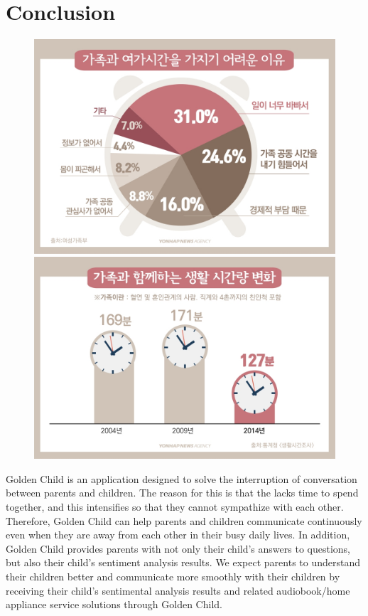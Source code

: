 \documentclass[conference]{IEEEtran}
\begin{document}
\section{\large{Conclusion}}
\begin{figure}[H]
\centering
\includegraphics[scale=0.2]{new_assets/sta2.jpg}
\includegraphics[scale=0.2]{new_assets/sta3.jpg}
\end{figure}
\vspace{1cm}
Golden Child is an application designed to solve the interruption of conversation between parents and children. The reason for this is that the lacks time to spend together, and this intensifies so that they cannot sympathize with each other. \\
Therefore, Golden Child can help parents and children communicate continuously even when they are away from each other in their busy daily lives. In addition, Golden Child provides parents with not only their child's answers to questions, but also their child's sentiment analysis results. We expect parents to understand their children better and communicate more smoothly with their children by receiving their child's sentimental analysis results and related audiobook/home appliance service solutions through Golden Child. \hfill\break \hfill\break
\end{document}
